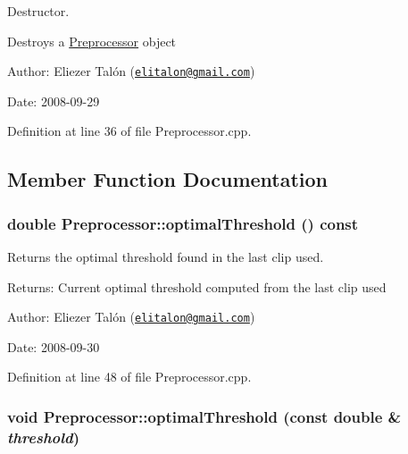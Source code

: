 Destructor. 

Destroys a \hyperlink{class_preprocessor}{Preprocessor} object

\begin{Desc}
\item[Author:]Eliezer Talón (\href{mailto:elitalon@gmail.com}{\tt elitalon@gmail.com}) \end{Desc}
\begin{Desc}
\item[Date:]2008-09-29 \end{Desc}


Definition at line 36 of file Preprocessor.cpp.

\subsection{Member Function Documentation}
\hypertarget{class_preprocessor_8cc19d799c87198f97356d41606aa4ac}{
\subsubsection[optimalThreshold]{\setlength{\rightskip}{0pt plus 5cm}double Preprocessor::optimalThreshold () const}}
\label{class_preprocessor_8cc19d799c87198f97356d41606aa4ac}


Returns the optimal threshold found in the last clip used. 

\begin{Desc}
\item[Returns:]Current optimal threshold computed from the last clip used\end{Desc}
\begin{Desc}
\item[Author:]Eliezer Talón (\href{mailto:elitalon@gmail.com}{\tt elitalon@gmail.com}) \end{Desc}
\begin{Desc}
\item[Date:]2008-09-30 \end{Desc}


Definition at line 48 of file Preprocessor.cpp.\hypertarget{class_preprocessor_50f1344cfbab71e64512c994ea4e3a03}{
\subsubsection[optimalThreshold]{\setlength{\rightskip}{0pt plus 5cm}void Preprocessor::optimalThreshold (const double \& {\em threshold})}}
\label{class_preprocessor_50f1344cfbab71e64512c994ea4e3a03}


